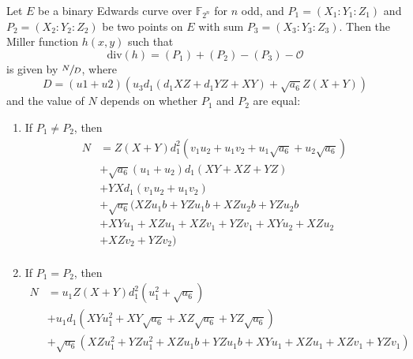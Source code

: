 \begin{thm}\label{thm:miller}
Let $E$ be a binary Edwards curve over $\mathbb{F}_{2^n}$ for $n$ odd, and $P_1
    = (X_1 : Y_1 : Z_1)$ and $P_2 = (X_2 : Y_2 : Z_2)$ be two points on $E$
    with sum $P_3 = (X_3 : Y_3 : Z_3)$.
Then the Miller function $h(x, y)$ such that
\[
\textrm{div}(h) = (P_1) + (P_2) - (P_3) - \mathcal{O}
\]
    is given by $\sfrac{N}{D}$, where
\[
D =
    (u1 + u2)
    (u_{3}  d_{1}  (d_{1} X Z + d_{1} Y Z + X Y) + \sqrt{a_6}  Z  (X + Y))
\]
    and the value of $N$ depends on whether $P_1$ and $P_2$ are equal:
\begin{enumerate}
\item   If $P_1 \ne P_2$, then 
\begin{align*}
N   &= Z  (X + Y)  d_{1}^{2}  (v_{1} u_{2} + u_{1} v_{2} + u_{1}
        \sqrt{a_6} + u_{2}\sqrt{a_6})\\
    &+ \sqrt{a_6}  (u_{1} + u_{2})  d_{1}  (X Y + X Z + Y Z)\\
    &+ Y  X  d_{1}  (v_{1} u_{2} + u_{1} v_{2})\\
    &+ \sqrt{a_6} (X Z u_{1} b + Y Z u_{1} b + X Z u_{2} b + Y Z u_{2} b\\
    &+ X Y u_{1} + X Z u_{1} + X Z v_{1} + Y Z v_{1} + X Y u_{2} + X Z u_{2} \\
    &+ X Z v_{2} + Y Z v_{2})\\
\end{align*}
\item If $P_1 = P_2$, then
\begin{align*}
N   &= u_{1}  Z  (X + Y)  d_{1}^{2}  (u_{1}^{2} + \sqrt{a_6})\\
    &+ u_{1}  d_{1}  (X Y u_{1}^{2} + X Y \sqrt{a_6} + X Z \sqrt{a_6} + Y Z
        \sqrt{a_6})\\
    &+  \sqrt{a_6}  (X Z u_{1}^{2} + Y Z u_{1}^{2} + X Z u_{1} b + Y Z u_{1} b
        + X Y u_{1} + X Z u_{1} + X Z v_{1} + Y Z v_{1})
\end{align*}
\end{enumerate}
\end{thm}

